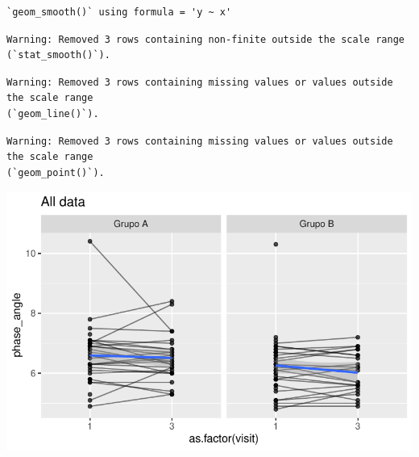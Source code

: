 \documentclass[
  letterpaper,
  DIV=11,
  numbers=noendperiod]{scrartcl}
\begin{document}
\begin{verbatim}
`geom_smooth()` using formula = 'y ~ x'
\end{verbatim}

\begin{verbatim}
Warning: Removed 3 rows containing non-finite outside the scale range
(`stat_smooth()`).
\end{verbatim}

\begin{verbatim}
Warning: Removed 3 rows containing missing values or values outside the scale range
(`geom_line()`).
\end{verbatim}

\begin{verbatim}
Warning: Removed 3 rows containing missing values or values outside the scale range
(`geom_point()`).
\end{verbatim}

\includegraphics{Outcomes_V1V2V3_files/figure-pdf/phase_angle_6-1.pdf}
\end{document}
